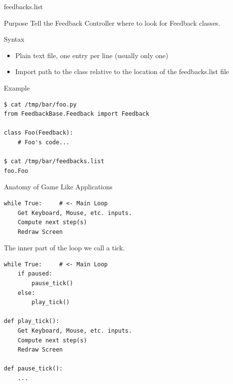 \documentclass{beamer}
\begin{document}
\begin{frame}[fragile]{feedbacks.list}
    \begin{block}{Purpose}
        Tell the Feedback Controller where to look for Feedback classes.
    \end{block}
    \begin{block}{Syntax}
        \begin{itemize}
            \item Plain text file, one entry per line (usually only one)
            \item Import path to the class relative to the location of the
                \alert{feedbacks.list} file
        \end{itemize}
    \end{block}
    \begin{exampleblock}{Example}
        \begin{lstlisting}
$ cat /tmp/bar/foo.py
from FeedbackBase.Feedback import Feedback

class Foo(Feedback):
    # Foo's code...

$ cat /tmp/bar/feedbacks.list
foo.Foo
        \end{lstlisting}
    \end{exampleblock}
\end{frame}

\begin{frame}{Anatomy of Game Like Applications}
    \begin{lstlisting}
while True:     # <- Main Loop
    Get Keyboard, Mouse, etc. inputs.
    Compute next step(s)
    Redraw Screen
    \end{lstlisting}
    The inner part of the loop we call a \alert{tick}.
    \pause
    \begin{lstlisting}
while True:     # <- Main Loop
    if paused:
        pause_tick()
    else:
        play_tick()

def play_tick():
    Get Keyboard, Mouse, etc. inputs.
    Compute next step(s)
    Redraw Screen

def pause_tick():
    ...
    \end{lstlisting}

\end{frame}
\end{document}
